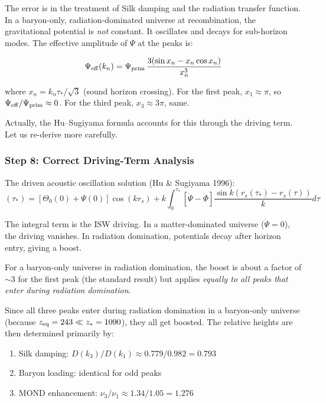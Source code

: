 \documentclass[11pt,a4paper]{article}
\begin{document}
The error is in the treatment of Silk damping and the radiation transfer function. In a baryon-only, radiation-dominated universe at recombination, the gravitational potential is \emph{not} constant. It oscillates and decays for sub-horizon modes. The effective amplitude of $\Psi$ at the peaks is:

\begin{equation}
\Psi_{\rm eff}(k_n) = \Psi_{\rm prim}\,\frac{3(\sin x_n - x_n\cos x_n)}{x_n^3}
\end{equation}

where $x_n = k_n\tau_* / \sqrt{3}$ (sound horizon crossing). For the first peak, $x_1 \approx \pi$, so $\Psi_{\rm eff}/\Psi_{\rm prim} \approx 0$. For the third peak, $x_3 \approx 3\pi$, same.

Actually, the Hu--Sugiyama formula accounts for this through the driving term. Let us re-derive more carefully.

\subsubsection{Step 8: Correct Driving-Term Analysis}

The driven acoustic oscillation solution (Hu \& Sugiyama 1996):
\begin{equation}
[\Theta_0 + \Psi](\tau_*) = [\Theta_0(0) + \Psi(0)]\cos(k r_s) + k\int_0^{\tau_*}[\dot{\Psi} - \dot{\Phi}]\frac{\sin k(r_s(\tau_*) - r_s(\tau))}{k}d\tau
\end{equation}

The integral term is the ISW driving. In a matter-dominated universe ($\dot{\Psi} = 0$), the driving vanishes. In radiation domination, potentials decay after horizon entry, giving a boost.

For a baryon-only universe in radiation domination, the boost is about a factor of $\sim 3$ for the first peak (the standard result) but applies \emph{equally to all peaks that enter during radiation domination}.

Since all three peaks enter during radiation domination in a baryon-only universe (because $z_{\rm eq} = 243 \ll z_* = 1090$), they all get boosted. The relative heights are then determined primarily by:

\begin{enumerate}
\item Silk damping: $D(k_3)/D(k_1) \approx 0.779/0.982 = 0.793$
\item Baryon loading: identical for odd peaks
\item MOND enhancement: $\nu_3/\nu_1 \approx 1.34/1.05 = 1.276$
\end{enumerate}
\end{document}
